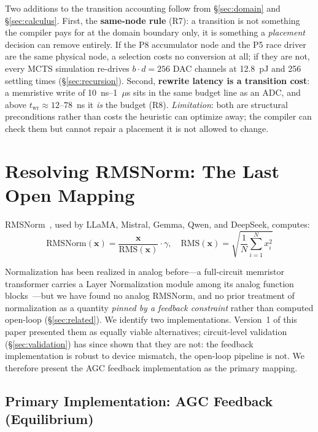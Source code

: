 \documentclass[11pt]{article}
\begin{document}
Two additions to the transition accounting follow from \S\ref{sec:domain} and \S\ref{sec:calculus}. First, the \textbf{same-node rule} (R7): a transition is not something the compiler pays for at the domain boundary only, it is something a \textit{placement} decision can remove entirely. If the P8 accumulator node and the P5 race driver are the same physical node, a selection costs no conversion at all; if they are not, every MCTS simulation re-drives $b\cdot d = 256$ DAC channels at 12.8~pJ and 256 settling times (\S\ref{sec:recursion}). Second, \textbf{rewrite latency is a transition cost}: a memristive write of 10~ns--1~$\mu$s sits in the same budget line as an ADC, and above $t_{\mathrm{wr}} \approx 12$--$78$~ns it \textit{is} the budget (R8). \textit{Limitation}: both are structural preconditions rather than costs the heuristic can optimize away; the compiler can check them but cannot repair a placement it is not allowed to change.

\section{Resolving RMSNorm: The Last Open Mapping}
\label{sec:rmsnorm}

RMSNorm~\cite{zhang_rmsnorm2019}, used by LLaMA, Mistral, Gemma, Qwen, and DeepSeek, computes:
\begin{equation}
\text{RMSNorm}(\mathbf{x}) = \frac{\mathbf{x}}{\text{RMS}(\mathbf{x})} \cdot \gamma, \quad \text{RMS}(\mathbf{x}) = \sqrt{\frac{1}{N}\sum_{i=1}^{N} x_i^2}
\end{equation}

Normalization has been realized in analog before---a full-circuit memristor transformer carries a Layer Normalization module among its analog function blocks~\cite{yang2022}---but we have found no analog RMSNorm, and no prior treatment of normalization as a quantity \textit{pinned by a feedback constraint} rather than computed open-loop (\S\ref{sec:related}). We identify two implementations. Version~1 of this paper presented them as equally viable alternatives; circuit-level validation (\S\ref{sec:validation}) has since shown that they are not: the feedback implementation is robust to device mismatch, the open-loop pipeline is not. We therefore present the AGC feedback implementation as the primary mapping.

\subsection{Primary Implementation: AGC Feedback (Equilibrium)}
\label{sec:agc}
\end{document}
